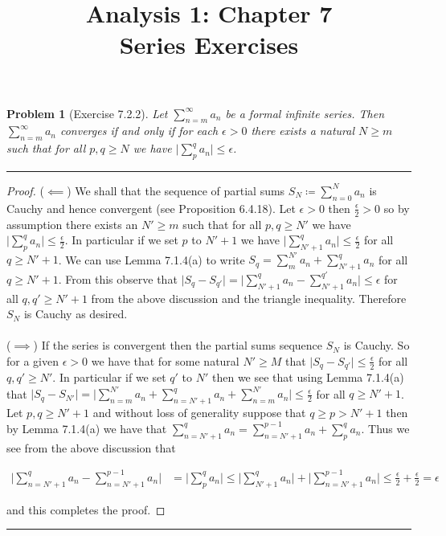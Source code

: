 \documentclass{article}
\title{\huge Analysis 1: Chapter 7 \\ \LARGE {Series Exercises}}
\date{}
\newcommand{\lined}{\noindent\rule{\textwidth}{1pt}}
\newtheorem*{problem}{Problem}
\begin{document}
	\maketitle
	
	\begin{problem}[Exercise 7.2.2] Let $\sum_{n=m}^\infty a_n$ be a formal infinite series. Then $\sum_{n=m}^\infty a_n$ converges if and only if for each $\epsilon > 0$ there exists a natural $N \geq m$ such that for all $p,q \geq N$ we have $\lvert \sum_{p}^q a_n \rvert \leq\epsilon$.
	\end{problem}
	
	\lined
	\begin{proof}
	($\impliedby$) We shall that the sequence of partial sums $S_N \coloneqq \sum_{n=0}^N a_n$ is Cauchy and hence convergent (see Proposition 6.4.18).
	Let $\epsilon > 0$ then $\frac{\epsilon}{2} > 0$ so by assumption there exists an $N' \geq m$ such that for all $p,q \geq N'$ we have $\lvert \sum_{p}^q a_n \rvert \leq \frac{\epsilon}{2}$. In particular if we set $p$ to $N' + 1$ we have $\lvert \sum_{N'+1}^q a_n \rvert \leq \frac{\epsilon}{2}$ for all $q \geq N'+1$. We can use Lemma 7.1.4(a) to write $S_q = \sum_{m}^{N'} a_n + \sum_{N'+1}^q a_n$ for all $q \geq N'+1$. From this observe that $\lvert S_q - S_{q'} \rvert = \lvert  \sum_{N'+1}^q a_n -  \sum_{N'+1}^{q'} a_n \rvert \leq \epsilon$ for all $q,q' \geq N'+1$ from the above discussion and the triangle inequality. Therefore $S_N$ is Cauchy as desired. \paragraph{} \noindent
	\noindent ($\implies$)
	If the series is convergent then the partial sums sequence $S_N$ is Cauchy. So for a given $\epsilon > 0$ we have that for some natural $N' \geq M$ that $\lvert S_q - S_{q'} \rvert \leq \frac{\epsilon}{2}$ for all $q,q' \geq N'$. In particular if we set $q'$ to $N'$ then we see that using Lemma 7.1.4(a) that $\lvert S_q - S_{N'} \rvert = \lvert \sum_{n=m}^{N'} a_n + \sum_{n=N'+1}^q a_n + \sum_{n=m}^{N'} a_n \rvert \leq \frac{\epsilon}{2}$ for all $q \geq N' + 1$. Let $p,q \geq N'+1$ and without loss of generality suppose that $q \geq p > N' + 1$ then by Lemma 7.1.4(a) we have that $\sum_{n = N' + 1}^q a_n = \sum_{n = N'+1}^{p-1} a_n + \sum_{p}^{q} a_n$. Thus we see from the above discussion that 
	
	\begin{align*}
\lvert \sum_{n = N' + 1}^q a_n - \sum_{n = N'+1}^{p-1} a_n \rvert  & = \lvert  \sum_{p}^{q} a_n \rvert \leq \lvert \sum_{N' + 1}^q a_n \rvert + \lvert \sum_{n = N' +1 }^{p-1} a_n \rvert  \leq \frac{\epsilon}{2} + \frac{\epsilon}{2} = \epsilon
\end{align*}

and this completes the proof.

	\end{proof}
	\lined
\end{document}
